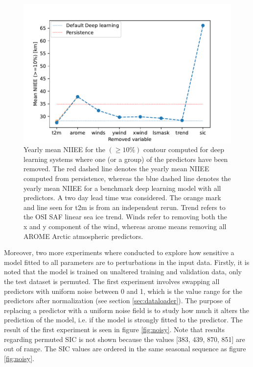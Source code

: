 \documentclass[../main/thesis.tex]{subfiles}
\begin{document}
\begin{figure}
    \centering
    \includegraphics[width=\textwidth]{leave_one_out.pdf}
    \caption{\label{fig:leave-one-out}Yearly mean NIIEE for the $(\geq10\%)$ contour computed for deep learning systems where one (or a group) of the predictors have been removed. The red dashed line denotes the yearly mean NIIEE computed from persistence, whereas the blue dashed line denotes the yearly mean NIIEE for a benchmark deep learning model with all predictors. A two day lead time was considered. The orange mark and line seen for t2m is from an independent rerun. Trend refers to the OSI SAF linear sea ice trend. Winds refer to removing both the x and y component of the wind, whereas arome means removing all AROME Arctic atmospheric predictors.}
\end{figure}

Moreover, two more experiments where conducted to explore how sensitive a model fitted to all parameters are to perturbations in the input data. Firstly, it is noted that the model is trained on unaltered training and validation data, only the test dataset is permuted. The first experiment involves swapping all predictors with uniform noise between 0 and 1, which is the value range for the predictors after normalization (see section \ref{sec:dataloader}). The purpose of replacing a predictor with a uniform noise field is to study how much it alters the prediction of the model, i.e. if the model is strongly fitted to the predictor. The result of the first experiment is seen in figure \ref{fig:noisy}. Note that results regarding permuted SIC is not shown because the values [383, 439, 870, 851] are out of range. The SIC values are ordered in the same seasonal sequence as figure \ref{fig:noisy}.
\end{document}
